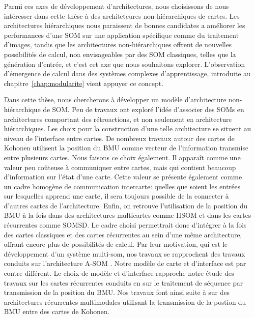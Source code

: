 \documentclass[../main]{subfiles}
\begin{document}
Parmi ces axes de développement d'architectures, nous choisissons de nous intéresser dans cette thèse à des architetcures non-hiérarchiques de cartes.
Les architectures hiérarchiques nous paraissent de bonnes candidates a améliorer les performances d'une SOM sur une application spécifique comme du traitement d'images, tandis que les architectures non-hiérarchiques offrent de nouvelles possibilités de calcul, non envisageables par des SOM classiques, telles que la génération d'entrée, et c'est cet axe que nous souhaitons explorer. L'observation d'émergence de calcul dans des systèmes complexes d'apprentissage, introduite au chapitre~\ref{chap:modularite} vient appuyer ce concept.

Dans cette thèse, nous chercherons à développer un modèle d'architecture non-hiérarchique de SOM. Peu de travaux ont exploré l'idée d'associer des SOMs en architectures comportant des rétroactions, et non seulement en architecture hiérarchiques.
Les choix pour la construction d'une telle architecture se situent au niveau de l'interface entre cartes. De nombreux travaux autour des cartes de Kohonen utilisent la position du BMU comme vecteur de l'information transmise entre plusieurs cartes. 
Nous faisons ce choix également. Il apparaît comme une valeur peu coûteuse à communiquer entre cartes, mais qui contient beaucoup d'information sur l'état d'une carte. Cette valeur se présente également comme un cadre homogène de communication intercarte: quelles que soient les entrées sur lesquelles apprend une carte, il sera toujours possible de la connecter à d'autres cartes de l'architecture. Enfin, on retrouve l'utilisation de la position du BMU à la fois dans des architectures multicartes comme HSOM et dans les cartes récurrentes comme SOMSD. Le cadre choisi permettrait donc d'intégrer à la fois des cartes classiques et des cartes récurrentes au sein d'une même architecture, offrant encore plus de possibilités de calcul. Par leur motivation, qui est le développement d'un système multi-som, nos travaux se rapprochent des travaux conduits sur l'architecture A-SOM \cite{johnsson_associating_2008, johnsson_associative_2009,gil_sarasom_2015, Buonamente2015DiscriminatingAS}. Notre modèle de carte et d'interface est par contre différent.
Le choix de modèle et d'interface rapproche notre étude des travaux sur les cartes récurrentes conduits en \cite{hagenbuchner_self-organizing_2003,Strickert2003UnsupervisedRS,fix20} sur le traitement de séquence par transmission de la position du BMU.
Nos travaux font ainsi suite à \cite{baheux_towards_2014} sur des architectures récurrentes multimodales utilisant la transmission de la postion du BMU entre des cartes de Kohonen. 

\ifSubfilesClassLoaded{
    \printbibliography
}{}
\end{document}
